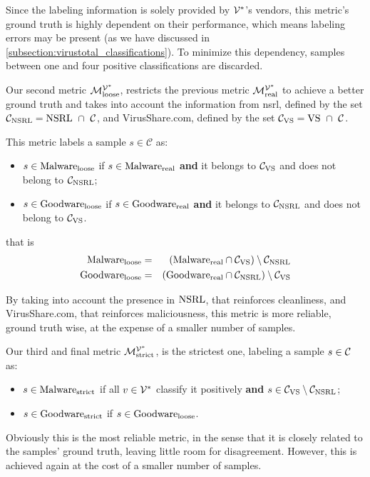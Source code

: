 Since the labeling information is solely provided by $\mathcal{V}^*$'s vendors, this metric's ground truth is highly dependent on their performance, which means labeling errors may be present (as we have discussed in \ref{subsection:virustotal_classifications}).
To minimize this dependency, samples between one and four positive classifications are discarded.

\medskip

Our second metric $\mathcal{M}_{\mathrm{loose}}^{\mathcal{V}^*}$, restricts the previous metric $\mathcal{M}_{\mathrm{real}}^{\mathcal{V}^*}$ to achieve a better ground truth and takes into account the information from \gls{nsrl}, defined by the set $\mathcal{C}_{\mathrm{NSRL}}=\mathrm{NSRL}\ \cap\ \mathcal{C}$, and VirusShare.com, defined by the set $\CVS=\VS\ \cap\ \CC$.

This metric labels a sample $s\in\mathcal{C}$ as:
\begin{itemize}
	\item $s\in\mathrm{Malware}_{\mathrm{loose}}$ if $s\in\mathrm{Malware}_{\mathrm{real}}$ \textbf{and} it belongs to $\mathcal{C}_{\mathrm{VS}}$ and does not belong to $\mathcal{C}_{\mathrm{NSRL}}$;
	\item $s\in\mathrm{Goodware}_{\mathrm{loose}}$ if $s\in\mathrm{Goodware}_{\mathrm{real}}$ \textbf{and} it belongs to $\mathcal{C}_{\mathrm{NSRL}}$ and does not belong to $\mathcal{C}_{\mathrm{VS}}$.
\end{itemize}
that is
\begin{eqnarray*}
	\mathrm{Malware}_{\mathrm{loose}}&=&\left(\mathrm{Malware}_{\mathrm{real}}\cap\mathcal{C}_{\mathrm{VS}}\right)\setminus\mathcal{C}_{\mathrm{NSRL}}\\
	\mathrm{Goodware}_{\mathrm{loose}}&=&\left(\mathrm{Goodware}_{\mathrm{real}}\cap\mathcal{C}_{\mathrm{NSRL}}\right)\setminus\mathcal{C}_{\mathrm{VS}}
\end{eqnarray*}

By taking into account the presence in $\mathrm{NSRL}$, that reinforces cleanliness, and VirusShare.com, that reinforces maliciousness, this metric is more reliable, ground truth wise, at the expense of a smaller number of samples.

\medskip

Our third and final metric $\mathcal{M}_{\mathrm{strict}}^{\mathcal{V}^*}$, is the strictest one, labeling a sample $s\in\mathcal{C}$ as:
\begin{itemize}
	\item $s\in\mathrm{Malware}_{\mathrm{strict}}$ if all $v\in\mathcal{V}^*$ classify it positively \textbf{and} $s\in\mathcal{C}_{\mathrm{VS}}\setminus\mathcal{C}_{\mathrm{NSRL}}$;
	\item $s\in\mathrm{Goodware}_{\mathrm{strict}}$ if $s\in\mathrm{Goodware}_{\mathrm{loose}}$.
\end{itemize}

Obviously this is the most reliable metric, in the sense that it is closely related to the samples' ground truth, leaving little room for disagreement. However, this is achieved again at the cost of a smaller number of samples.


